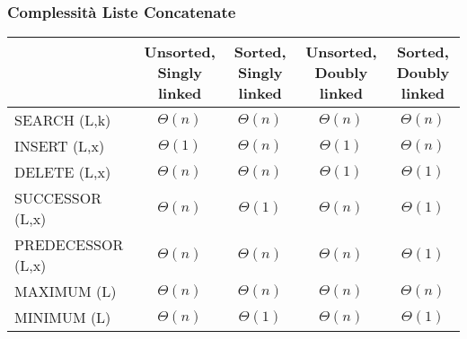 \subsubsection{Complessità Liste Concatenate}

\begin{tabular}{|l|c|c|c|c|}
\hline
 & \shortstack{Unsorted, \\ Singly linked} & \shortstack{Sorted, \\ Singly linked} & \shortstack{Unsorted, \\ Doubly linked} & \shortstack{Sorted, \\ Doubly linked} \\
\hline
SEARCH (L,k) & $\Theta(n)$ & $\Theta(n)$ & $\Theta(n)$ & $\Theta(n)$ \\
\hline
INSERT (L,x) & $\Theta(1)$ & $\Theta(n)$ & $\Theta(1)$ & $\Theta(n)$ \\
\hline
DELETE (L,x) & $\Theta(n)$ & $\Theta(n)$ & $\Theta(1)$ & $\Theta(1)$ \\
\hline
SUCCESSOR (L,x) & $\Theta(n)$ & $\Theta(1)$ & $\Theta(n)$ & $\Theta(1)$ \\
\hline
PREDECESSOR (L,x) & $\Theta(n)$ & $\Theta(n)$ & $\Theta(n)$ & $\Theta(1)$ \\
\hline
MAXIMUM (L) & $\Theta(n)$ & $\Theta(n)$ & $\Theta(n)$ & $\Theta(n)$ \\
\hline
MINIMUM (L) & $\Theta(n)$ & $\Theta(1)$ & $\Theta(n)$ & $\Theta(1)$ \\
\hline
\end{tabular}